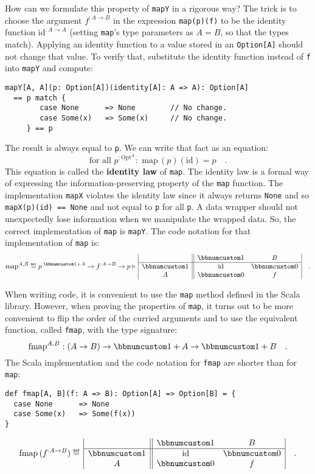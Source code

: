 How can we formulate this property of \lstinline!mapY! in a rigorous
way? The trick is to choose the argument $f^{:A\rightarrow B}$ in
the expression \lstinline!map(p)(f)! to be the identity function
$\text{id}^{:A\rightarrow A}$ (setting \lstinline!map!\textsf{'}s type parameters
as $A=B$, so that the types match). Applying an identity function
to a value stored in an \lstinline!Option[A]! should not change that
value. To verify that, substitute the identity function instead of
\lstinline!f! into \lstinline!mapY! and compute:
\begin{lstlisting}
mapY[A, A](p: Option[A])(identity[A]: A => A): Option[A]
  == p match {
        case None      => None        // No change.
        case Some(x)   => Some(x)     // No change.
     } == p
\end{lstlisting}
The result is always equal to \lstinline!p!. We can write that fact
as an equation:
\[
\text{for all }p^{:\text{Opt}^{A}}:\,\,\text{map}\,(p)(\text{id})=p\quad.
\]
This equation is called the \textbf{identity law}
of \lstinline!map!. The identity law is a formal way of expressing
the information-preserving property of the \lstinline!map! function.
The implementation \lstinline!mapX! violates the identity law since
it always returns \lstinline!None! and so \lstinline!mapX(p)(id) == None!
and not equal to \lstinline!p! for all \lstinline!p!. A data wrapper
should not unexpectedly lose information when we manipulate the wrapped
data. So, the correct implementation of \lstinline!map! is \lstinline!mapY!.
The code notation for that implementation of \lstinline!map! is:
\[
\text{map}^{A,B}\triangleq p^{:\bbnum 1+A}\rightarrow f^{:A\rightarrow B}\rightarrow p\triangleright\,\begin{array}{|c||cc|}
 & \bbnum 1 & B\\
\hline \bbnum 1 & \text{id} & \bbnum 0\\
A & \bbnum 0 & f
\end{array}\quad.
\]

When writing code, it is convenient to use the \lstinline!map! method
defined in the Scala library. However, when proving the properties
of \lstinline!map!, it turns out to be more convenient to flip the
order of the curried arguments and to use the equivalent function,
called \lstinline!fmap!, with the type signature:
\[
\text{fmap}^{A,B}:\left(A\rightarrow B\right)\rightarrow\bbnum 1+A\rightarrow\bbnum 1+B\quad.
\]
The Scala implementation and the code notation for \lstinline!fmap!
are shorter than for \lstinline!map!:
\begin{lstlisting}
def fmap[A, B](f: A => B): Option[A] => Option[B] = {
  case None      => None
  case Some(x)   => Some(f(x))
}
\end{lstlisting}
\begin{equation}
\text{fmap}\,(f^{:A\rightarrow B})\triangleq\,\begin{array}{|c||cc|}
 & \bbnum 1 & B\\
\hline \bbnum 1 & \text{id} & \bbnum 0\\
A & \bbnum 0 & f
\end{array}\quad.\label{eq:f-def-opt-fmap-matrix-notation}
\end{equation}

